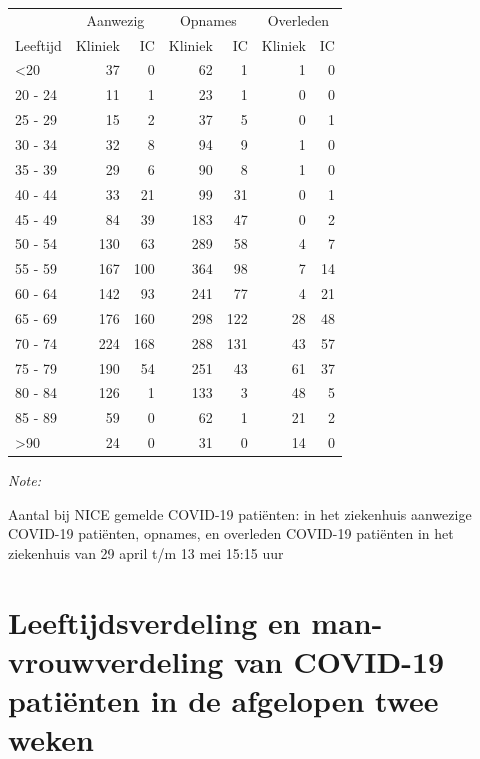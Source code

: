 \documentclass[
  english,
  man,floatsintext]{apa6}
\begin{document}
\begin{table}
\centering\begingroup\fontsize{10}{12}\selectfont

\begin{threeparttable}
\begin{tabular}{lrrrrrr}
\toprule
\multicolumn{1}{c}{ } & \multicolumn{2}{c}{Aanwezig} & \multicolumn{2}{c}{Opnames} & \multicolumn{2}{c}{Overleden} \\
\cmidrule(l{3pt}r{3pt}){2-3} \cmidrule(l{3pt}r{3pt}){4-5} \cmidrule(l{3pt}r{3pt}){6-7}
Leeftijd & Kliniek & IC & Kliniek & IC & Kliniek & IC\\
\midrule
<20 & 37 & 0 & 62 & 1 & 1 & 0\\
20 - 24 & 11 & 1 & 23 & 1 & 0 & 0\\
25 - 29 & 15 & 2 & 37 & 5 & 0 & 1\\
30 - 34 & 32 & 8 & 94 & 9 & 1 & 0\\
35 - 39 & 29 & 6 & 90 & 8 & 1 & 0\\
40 - 44 & 33 & 21 & 99 & 31 & 0 & 1\\
45 - 49 & 84 & 39 & 183 & 47 & 0 & 2\\
50 - 54 & 130 & 63 & 289 & 58 & 4 & 7\\
55 - 59 & 167 & 100 & 364 & 98 & 7 & 14\\
60 - 64 & 142 & 93 & 241 & 77 & 4 & 21\\
65 - 69 & 176 & 160 & 298 & 122 & 28 & 48\\
70 - 74 & 224 & 168 & 288 & 131 & 43 & 57\\
75 - 79 & 190 & 54 & 251 & 43 & 61 & 37\\
80 - 84 & 126 & 1 & 133 & 3 & 48 & 5\\
85 - 89 & 59 & 0 & 62 & 1 & 21 & 2\\
>90 & 24 & 0 & 31 & 0 & 14 & 0\\
\bottomrule
\end{tabular}
\begin{tablenotes}
\item \textit{Note: } 
\item Aantal bij NICE gemelde COVID-19 patiënten: in het ziekenhuis aanwezige COVID-19 patiënten, opnames, en overleden COVID-19 patiënten in het ziekenhuis van 29 april t/m 13 mei 15:15 uur
\end{tablenotes}
\end{threeparttable}
\endgroup{}
\end{table}

\newpage

\hypertarget{leeftijdsverdeling-en-man-vrouwverdeling-van-covid-19-patiuxebnten-in-de-afgelopen-twee-weken}{%
\section{Leeftijdsverdeling en man-vrouwverdeling van COVID-19 patiënten in de afgelopen twee weken}\label{leeftijdsverdeling-en-man-vrouwverdeling-van-covid-19-patiuxebnten-in-de-afgelopen-twee-weken}}
\end{document}
